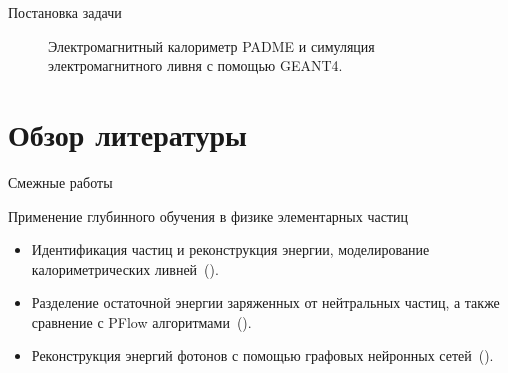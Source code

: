 \documentclass[9pt]{beamer}
\begin{document}
\begin{frame}{Постановка задачи}
    \begin{figure}
        \centering
        \qquad
        \caption{Электромагнитный калориметр PADME и симуляция электромагнитного ливня с помощью GEANT4.}
    \end{figure}
\end{frame}

\section{Обзор литературы}

\begin{frame}{Смежные работы}
    \begin{block}{Применение глубинного обучения в физике элементарных частиц}
        \begin{itemize}
            \item Идентификация частиц и реконструкция энергии, моделирование калориметрических ливней~(\cite{Belayneh_2020}).
            \item Разделение остаточной энергии заряженных от нейтральных частиц, а также сравнение с PFlow алгоритмами~(\cite{Di_Bello_2021}).
            \item Реконструкция энергий фотонов с помощью графовых нейронных сетей~(\cite{Wemmer_2023}).
        \end{itemize}
    \end{block}
\end{frame}
\end{document}
